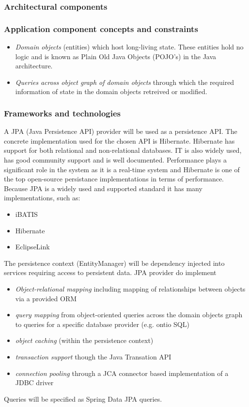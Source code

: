 \documentclass[a4paper,12pt]{report}
\begin{document}
\subsubsection {Architectural components}

\subsubsection {Application component concepts and constraints}
	\begin {itemize}
		\item \textit{Domain objects} (entities) which host long-living state. These entities hold no logic and is known as Plain Old Java Objects (POJO's) in the Java architecture.

		\item \textit{Queries across object graph of domain objects } through which the required information of state in the domain objects retreived or modified.
	\end {itemize}
\subsubsection {Frameworks and technologies}
A JPA (Java Persistence API) provider will be used as a persistence API. The concrete implementation used for the chosen API is Hibernate. Hibernate has support for both relational and non-relational databases. IT is also widely used, has good community support and is well documented. Performance plays a significant role in the system as it is a real-time system and Hibernate is one of the top open-source persistance implementations in terms of performance. \newline
Because JPA is a widely used and supported standard it has many implementations, such as:
	\begin {itemize} 
		\item iBATIS
		\item Hibernate
		\item EclipseLink
	\end {itemize} 

The persistence context (EntityManager) will be dependency injected into services requiring access to persistent data. JPA provider do implement

	\begin {itemize} 
		\item \textit{Object-relational mapping} including mapping of relationships between objects via a provided ORM
		\item \textit{query mapping} from object-oriented queries across the domain objects graph to queries for a specific database provider (e.g. ontio SQL)
		\item\textit{object caching} (within the persistence context)
		\item \textit{transaction support} though the Java Transation API
		\item \textit{connection pooling} through a JCA connector based implementation of a JDBC driver
	\end {itemize} 

Queries will be specified as Spring Data JPA queries.
\end{document}
